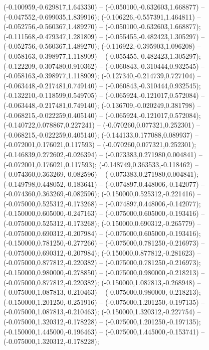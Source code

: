  (-0.100959,-0.629817,1.643330) -- (-0.050100,-0.632603,1.668877) -- (-0.047552,-0.699035,1.839916);
 (-0.106226,-0.557391,1.464811) -- (-0.052756,-0.560367,1.489270) -- (-0.050100,-0.632603,1.668877);
 (-0.111568,-0.479347,1.281809) -- (-0.055455,-0.482423,1.305297) -- (-0.052756,-0.560367,1.489270);
 (-0.116922,-0.395903,1.096208) -- (-0.058163,-0.398977,1.118909) -- (-0.055455,-0.482423,1.305297);
 (-0.122209,-0.307480,0.910362) -- (-0.060843,-0.310444,0.932545) -- (-0.058163,-0.398977,1.118909);
 (-0.127340,-0.214739,0.727104) -- (-0.063448,-0.217481,0.749140) -- (-0.060843,-0.310444,0.932545);
 (-0.132210,-0.118599,0.549705) -- (-0.065924,-0.121017,0.572084) -- (-0.063448,-0.217481,0.749140);
 (-0.136709,-0.020249,0.381798) -- (-0.068215,-0.022259,0.405140) -- (-0.065924,-0.121017,0.572084);
 (-0.140722,0.078867,0.227241) -- (-0.070260,0.077321,0.252301) -- (-0.068215,-0.022259,0.405140);
 (-0.144133,0.177088,0.089937) -- (-0.072001,0.176021,0.117593) -- (-0.070260,0.077321,0.252301);
 (-0.146839,0.272602,-0.026394) -- (-0.073383,0.271980,0.004841) -- (-0.072001,0.176021,0.117593);
 (-0.148749,0.363533,-0.118462) -- (-0.074360,0.363269,-0.082596) -- (-0.073383,0.271980,0.004841);
 (-0.149798,0.448052,-0.183641) -- (-0.074897,0.448006,-0.142077) -- (-0.074360,0.363269,-0.082596);
 (-0.150000,0.525312,-0.221416) -- (-0.075000,0.525312,-0.173268) -- (-0.074897,0.448006,-0.142077);
 (-0.150000,0.605000,-0.247163) -- (-0.075000,0.605000,-0.193416) -- (-0.075000,0.525312,-0.173268);
 (-0.150000,0.690312,-0.265779) -- (-0.075000,0.690312,-0.207984) -- (-0.075000,0.605000,-0.193416);
 (-0.150000,0.781250,-0.277266) -- (-0.075000,0.781250,-0.216973) -- (-0.075000,0.690312,-0.207984);
 (-0.150000,0.877812,-0.281623) -- (-0.075000,0.877812,-0.220382) -- (-0.075000,0.781250,-0.216973);
 (-0.150000,0.980000,-0.278850) -- (-0.075000,0.980000,-0.218213) -- (-0.075000,0.877812,-0.220382);
 (-0.150000,1.087813,-0.268948) -- (-0.075000,1.087813,-0.210463) -- (-0.075000,0.980000,-0.218213);
 (-0.150000,1.201250,-0.251916) -- (-0.075000,1.201250,-0.197135) -- (-0.075000,1.087813,-0.210463);
 (-0.150000,1.320312,-0.227754) -- (-0.075000,1.320312,-0.178228) -- (-0.075000,1.201250,-0.197135);
 (-0.150000,1.445000,-0.196463) -- (-0.075000,1.445000,-0.153741) -- (-0.075000,1.320312,-0.178228);
